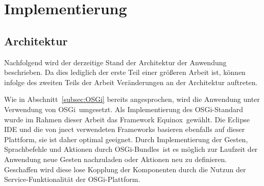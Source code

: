 \chapter{Implementierung}
\label{chap:Implementierung}











\section{Architektur}

Nachfolgend wird der derzeitige Stand der Architektur der Anwendung beschrieben. Da dies lediglich der erste Teil einer gr\"oßeren Arbeit ist, k\"onnen infolge des zweiten Teils der Arbeit Ver\"anderungen an der Architektur auftreten. 

Wie in Abschnitt~\ref{subsec:OSGi} bereits angesprochen, wird die Anwendung unter Verwendung von OSGi~\footnotemark[1] umgesetzt. Als Implementierung des OSGi-Standard wurde im Rahmen dieser Arbeit das Framework Equinox~\footnotemark[2] gew\"ahlt. Die Eclipse IDE und die von jnect verwendeten Frameworks basieren ebenfalls auf dieser Plattform, sie ist daher optimal geeignet. Durch Implementierung der Gesten, Sprachbefehle und Aktionen durch OSGi-Bundles~\footnotemark[3] ist es m\"oglich zur Laufzeit der Anwendung neue Gesten nachzuladen oder Aktionen neu zu definieren. Geschaffen wird diese lose Kopplung der Komponenten durch die Nutzun der Service-Funktionalit\"at der OSGi-Plattform.

